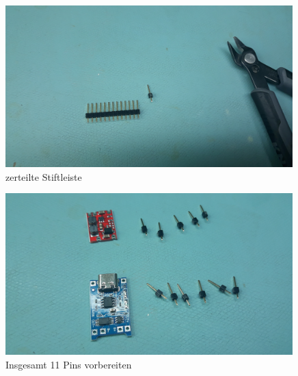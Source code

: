 \documentclass[12pt, a4paper]{article}		%
\begin{document}
\begin{minipage}[t]{0.49\textwidth}
\begin{figure}[H]
	\centering
		\includegraphics[width=0.99\textwidth]{Grafiken/20200726_121920.jpg}
	\caption{zerteilte Stiftleiste}
	\label{fig:20200726_121444}
\end{figure}
\end{minipage}

\begin{figure}[H]
	\centering
		\includegraphics[width=0.99\textwidth]{Grafiken/20200726_122303.jpg}
	\caption{Insgesamt 11 Pins vorbereiten}
	\label{fig:20200726_121444}
\end{figure}
\end{document}
